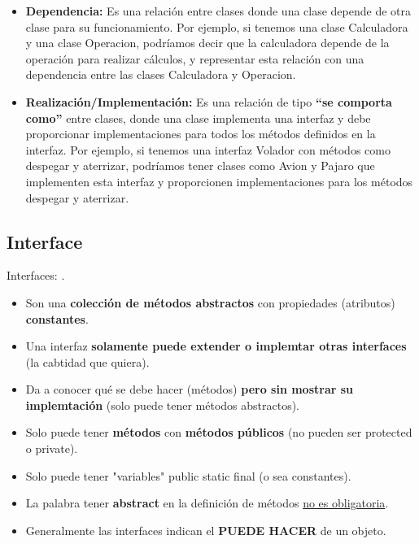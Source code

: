 \documentclass[../main.tex]{subfiles}
\begin{document}
\begin{itemize}
            \item \textbf{Dependencia:} Es una relación entre clases donde una clase depende de otra clase para su funcionamiento. Por ejemplo, si tenemos una clase Calculadora y una clase Operacion, podríamos decir que la calculadora depende de la operación para realizar cálculos, y representar esta relación con una dependencia entre las clases Calculadora y Operacion.
            \item \textbf{Realización/Implementación:} Es una relación de tipo \textbf{“se comporta como”} entre clases, donde una clase implementa una interfaz y debe proporcionar implementaciones para todos los métodos definidos en la interfaz. Por ejemplo, si tenemos una interfaz Volador con métodos como despegar y aterrizar, podríamos tener clases como Avion y Pajaro que implementen esta interfaz y proporcionen implementaciones para los métodos despegar y aterrizar.
        \end{itemize}
        
    \subsection{Interface}
        Interfaces: \cite{interfaces}.
        \begin{itemize}
            \item Son una \textbf{colección de métodos abstractos} con propiedades (atributos) \textbf{constantes}.
            \item Una interfaz \textbf{solamente puede extender o implemtar otras interfaces} (la cabtidad que quiera).
            \item Da a conocer qué se debe hacer (métodos) \textbf{pero sin mostrar su implemtación} (solo puede tener métodos abstractos).
            \item Solo puede tener \textbf{métodos} con \textbf{métodos públicos} (no pueden ser protected o private).
            \item Solo puede tener "variables" public static final (o sea constantes).
            \item La palabra tener \textbf{abstract} en la definición de métodos \underline{no es obligatoria}.
            \item Generalmente las interfaces indican el \textbf{PUEDE HACER} de un objeto.
        \end{itemize}
\end{document}
